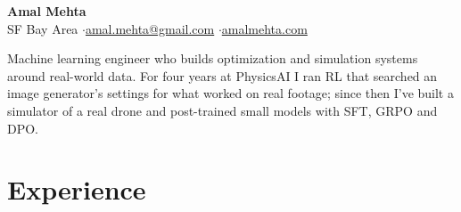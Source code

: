 \documentclass[10pt]{article}
\begin{document}
\fontsize{10}{11.3}\selectfont

\begin{center}
{\LARGE\bfseries Amal Mehta}\\[3pt]
SF Bay Area \quad$\cdot$\quad \href{mailto:amal.mehta@gmail.com}{amal.mehta@gmail.com} \quad$\cdot$\quad \href{https://amalmehta.com/}{amalmehta.com}
\end{center}

Machine learning engineer who builds optimization and simulation systems around real-world data. For four years at PhysicsAI I ran RL that searched an image generator's settings for what worked on real footage; since then I've built a simulator of a real drone and post-trained small models with SFT, GRPO and DPO.

\section*{Experience}
\end{document}
